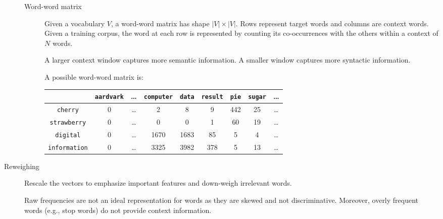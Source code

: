 \begin{description}
\begin{description}
            \item[Word-word matrix] 
                Given a vocabulary $V$, a word-word matrix has shape $|V| \times |V|$. Rows represent target words and columns are context words.
                Given a training corpus, the word at each row is represented by counting its co-occurrences with the others within a context of $N$ words.

                \begin{remark}
                    A larger context window captures more semantic information. A smaller window captures more syntactic information.
                \end{remark}

                \begin{example}
                    A possible word-word matrix is:
                    \begin{table}[H]
                        \centering
                        \footnotesize
                        \begin{tabular}{ccccccccc}
                            \toprule
                            & \texttt{aardvark} & \dots & \texttt{computer} & \texttt{data} & \texttt{result} & \texttt{pie} & \texttt{sugar} & \dots \\
                            \midrule
                            \texttt{cherry} & 0 & \dots & 2 & 8 & 9 & 442 & 25 & \dots \\
                            \texttt{strawberry} & 0 & \dots & 0 & 0 & 1 & 60 & 19 & \dots \\
                            \texttt{digital} & 0 & \dots & 1670 & 1683 & 85 & 5 & 4 & \dots \\
                            \texttt{information} & 0 & \dots & 3325 & 3982 & 378 & 5 & 13 & \dots \\
                            \bottomrule
                        \end{tabular}
                    \end{table}
                \end{example}
        \end{description}

    \item[Reweighing] 
        Rescale the vectors to emphasize important features and down-weigh irrelevant words.

        \begin{remark}
            Raw frequencies are not an ideal representation for words as they are skewed and not discriminative. Moreover, overly frequent words (e.g., stop words) do not provide context information.
        \end{remark}


\end{description}
